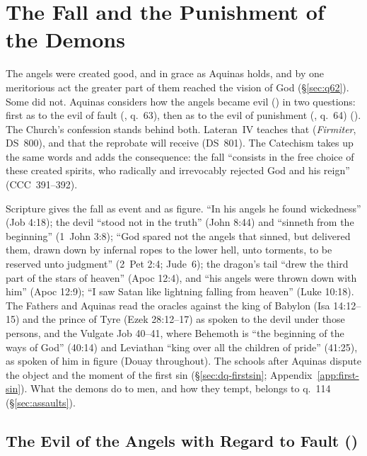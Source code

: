 \section{The Fall and the Punishment of the Demons}\label{sec:fall}

The angels were created good, and in grace as Aquinas holds, and by one
meritorious act the greater part of them reached the vision of God
(\S\ref{sec:q62}). Some did not. Aquinas considers how the angels
became evil () in two questions:
first as to the evil of fault (, q.~63), then as to
the evil of punishment (, q.~64) ().
The Church's confession stands behind both.
Lateran~IV teaches that  (\emph{Firmiter}, DS~800), and that
the reprobate will receive 
(DS~801). The Catechism takes up the same words and adds the
consequence: the fall ``consists in the free choice of these created
spirits, who radically and irrevocably rejected God and his reign''
(CCC~391--392).

Scripture gives the fall as event and as figure. ``In his angels he
found wickedness'' (Job 4:18); the devil ``stood not in the truth''
(John 8:44) and ``sinneth from the beginning'' (1~John 3:8); ``God
spared not the angels that sinned, but delivered them, drawn down by
infernal ropes to the lower hell, unto torments, to be reserved unto
judgment'' (2~Pet 2:4; Jude~6); the dragon's tail ``drew the third part
of the stars of heaven'' (Apoc 12:4), and ``his angels were thrown down
with him'' (Apoc 12:9); ``I saw Satan like lightning falling from
heaven'' (Luke 10:18). The Fathers and Aquinas read the oracles against
the king of Babylon (Isa 14:12--15) and the prince of Tyre (Ezek
28:12--17) as spoken to the devil under those persons, and the Vulgate
Job 40--41, where Behemoth is ``the beginning of the ways of God''
(40:14) and Leviathan ``king over all the children of pride'' (41:25),
as spoken of him in figure (Douay throughout). The schools after Aquinas dispute the object and
the moment of the first sin (\S\ref{sec:dq-firstsin};
Appendix~\ref{app:first-sin}). What the demons do to men, and how they
tempt, belongs to q.~114 (\S\ref{sec:assaults}).

\subsection{The Evil of the Angels with Regard to Fault
()}\label{sec:q63}

